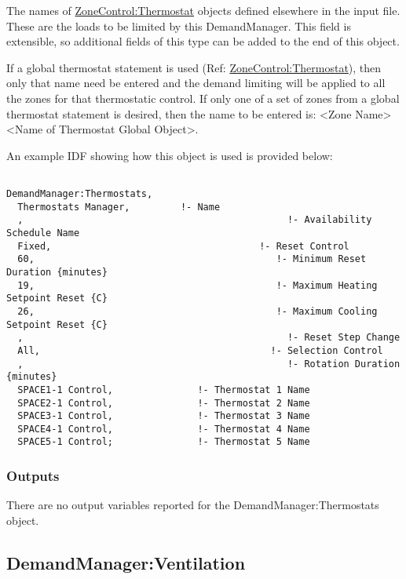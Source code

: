 The names of \hyperref[zonecontrolthermostat]{ZoneControl:Thermostat} objects defined elsewhere in the input file. These are the loads to be limited by this DemandManager.  This field is extensible, so additional fields of this type can be added to the end of this object.

If a global thermostat statement is used (Ref: \hyperref[zonecontrolthermostat]{ZoneControl:Thermostat}), then only that name need be entered and the demand limiting will be applied to all the zones for that thermostatic control. If only one of a set of zones from a global thermostat statement is desired, then the name to be entered is: \textless{}Zone Name\textgreater{} \textless{}Name of Thermostat Global Object\textgreater{}.

An example IDF showing how this object is used is provided below:

\begin{lstlisting}

DemandManager:Thermostats,
  Thermostats Manager,         !- Name
  ,                                               !- Availability Schedule Name
  Fixed,                                     !- Reset Control
  60,                                           !- Minimum Reset Duration {minutes}
  19,                                           !- Maximum Heating Setpoint Reset {C}
  26,                                           !- Maximum Cooling Setpoint Reset {C}
  ,                                               !- Reset Step Change
  All,                                         !- Selection Control
  ,                                               !- Rotation Duration {minutes}
  SPACE1-1 Control,               !- Thermostat 1 Name
  SPACE2-1 Control,               !- Thermostat 2 Name
  SPACE3-1 Control,               !- Thermostat 3 Name
  SPACE4-1 Control,               !- Thermostat 4 Name
  SPACE5-1 Control;               !- Thermostat 5 Name
\end{lstlisting}

\subsubsection{Outputs}\label{outputs-4-002}

There are no output variables reported for the DemandManager:Thermostats object.

\subsection{DemandManager:Ventilation}\label{demandmanagerventilation}

